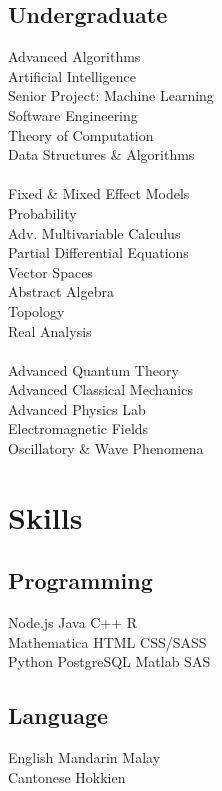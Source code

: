 \documentclass{deedy-resume-openfont}
\begin{document}
\begin{minipage}[t]{0.33\textwidth}
\subsection{Undergraduate}
Advanced Algorithms \\
Artificial Intelligence \\
Senior Project: Machine Learning \\
Software Engineering \\
Theory of Computation \\
Data Structures \& Algorithms \\
\ \\
Fixed \& Mixed Effect Models \\
Probability \\
Adv. Multivariable Calculus \\
Partial Differential Equations \\
Vector Spaces \\
Abstract Algebra \\
Topology \\
Real Analysis \\
\ \\
Advanced Quantum Theory \\
Advanced Classical Mechanics \\
Advanced Physics Lab \\
Electromagnetic Fields \\
Oscillatory \& Wave Phenomena \\

\sectionsep


\section{Skills}
\subsection{Programming}
Node.js \textbullet{} Java \textbullet{} C++ \textbullet{} R \\
Mathematica \textbullet{} HTML \textbullet{} CSS/SASS \\ 

Python \textbullet{} PostgreSQL \textbullet{} Matlab \textbullet{} SAS \\
\sectionsep

\subsection{Language}
English \textbullet{} Mandarin \textbullet{} Malay \\ 
Cantonese \textbullet{} Hokkien
\sectionsep

%
%

\end{minipage} 
\end{document}
